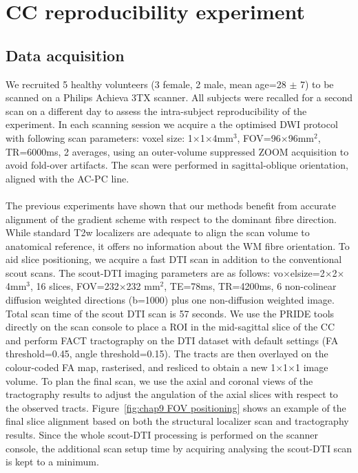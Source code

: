 \section{CC reproducibility experiment}
\subsection{Data acquisition}
We recruited 5 healthy volunteers (3 female, 2 male, mean age=28 $\pm$ 7) to be scanned on a Philips Achieva 3TX scanner. All subjects were recalled for a second scan on a different day to assess the intra-subject reproducibility of the experiment. In each scanning session we acquire a the optimised DWI protocol with following scan parameters: voxel size: 1$\times$1$\times$4mm$^3$, FOV=96$\times$96mm$^2$, TR=6000ms, 2 averages, using an outer-volume suppressed ZOOM acquisition \citep{Wilm:2007} to avoid fold-over artifacts. The scan were performed in sagittal-oblique orientation, aligned with the AC-PC line.
\paragraph{}
The previous experiments have shown that our \SF{} methods benefit from accurate alignment of the gradient scheme with respect to the dominant fibre direction. While standard T2w localizers are adequate to align the scan volume to anatomical reference, it offers no information about the WM fibre orientation. To aid slice positioning, we acquire a fast DTI scan in addition to the conventional scout scans. The scout-DTI imaging parameters are as follows: vo$\times$elsize=2$\times$2$\times$4mm$^3$, 16 slices, FOV=232$\times$232 mm$^2$, TE=78ms, TR=4200ms, 6 non-colinear diffusion weighted directions (b=1000) plus one non-diffusion weighted image. Total scan time of the scout DTI scan is 57 seconds. We use the PRIDE tools directly on the scan console to place a \gls{ROI} in the mid-sagittal slice of the \gls{CC} and perform FACT tractography on the DTI dataset with default settings (FA threshold=0.45, angle threshold=0.15). The tracts are then overlayed on the colour-coded FA map, rasterised, and resliced to obtain a new 1$\times$1$\times$1 image volume. To plan the final \SF{} scan, we use the axial and coronal views of the tractography results to adjust the angulation of the axial slices with respect to the observed tracts.  Figure~\ref{fig:chap9 FOV positioning} shows an example of the final slice alignment based on both the structural localizer scan and tractography results. Since the whole scout-DTI processing is performed on the scanner console, the additional scan setup time by acquiring analysing the scout-DTI scan is kept to a minimum.

